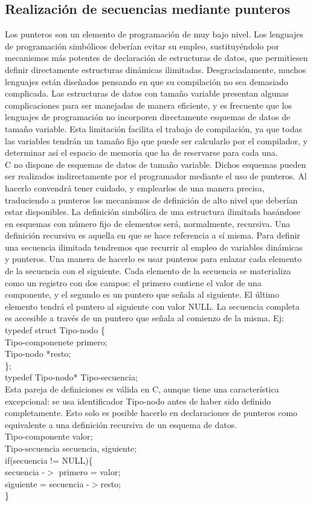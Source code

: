 \documentclass[11pt,a4paper]{article}
\begin{document}
  	\subsection{Realización de secuencias mediante punteros}
  	Los punteros son un elemento de programación de muy bajo nivel. Los lenguajes
  	de programación simbólicos deberían evitar su empleo, sustituyéndolo
  	por mecanismos más potentes de declaración de estructuras de datos, que
  	permitiesen definir directamente estructuras dinámicas ilimitadas.
  	Desgraciadamente, muchos lenguajes están diseñados pensando en que su compilación
  	no sea demasiado complicada. Las estructuras de datos con tamaño
  	variable presentan algunas complicaciones para ser manejadas de manera eficiente, y es frecuente que los lenguajes de programación no incorporen directamente
  	esquemas de datos de tamaño variable. Esta limitación facilita el trabajo de compilación, ya que todas las variables tendrán un tamaño fijo que puede ser calcularlo por el compilador, y determinar así el espacio de memoria
  	que ha de reservarse para cada una.\\
  	C no dispone de esquemas de datos de tamaño variable. Dichos esquemas pueden ser realizados indirectamente por el programador mediante el uso de punteros. Al hacerlo convendrá tener cuidado, y emplearlos de una manera
  	precisa, traduciendo a punteros los mecanismos de definición de alto nivel que deberían estar disponibles. La definición simbólica de una estructura ilimitada basándose en esquemas
  	con número fijo de elementos será, normalmente, recursiva. Una definición recursiva es aquella en que se hace referencia a sí misma.
  	Para definir una secuencia ilimitada tendremos que recurrir al empleo de variables
  	dinámicas y punteros. Una manera de hacerlo es usar punteros para
  	enlazar cada elemento de la secuencia con el siguiente. Cada elemento de la secuencia se materializa como un registro con dos campos:
  	el primero contiene el valor de una componente, y el segundo es un puntero
  	que señala al siguiente. El último elemento tendrá el puntero al siguiente con valor NULL. La secuencia completa es accesible a través de un puntero que
  	señala al comienzo de la misma. Ej:
  	\\
  	typedef struct Tipo-nodo \{ \\
  	Tipo-componenete primero;\\
  	Tipo-nodo *resto;\\
  	\};\\
  	typedef Tipo-nodo* Tipo-secuencia;\\
  	Esta pareja de definiciones es válida en C, aunque tiene una característica excepcional: se usa identificador Tipo-nodo antes de haber sido definido completamente. Esto solo es posible hacerlo en declaraciones de punteros como equivalente a una definición recursiva de un esquema de datos.
  	\\
  	Tipo-componente valor;\\
  	Tipo-secuencia secuencia, siguiente;\\
  if(secuencia != NULL)\{\\
  secuencia -$>$ primero = valor;\\
  siguiente = secuencia -$>$resto;\\  
  \}\\
\end{document}
